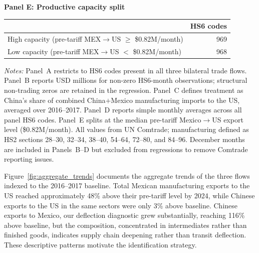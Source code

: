 \documentclass[11pt]{article}
\begin{document}
\begin{table}[tbp]
\begin{threeparttable}
\bigskip

\textbf{Panel E: Productive capacity split} \\[4pt]
\begin{tabular}{lr}
\toprule
 & HS6 codes \\
\midrule
High capacity (pre-tariff MEX$\to$US $\geq$ \$0.82M/month) & 969 \\
Low capacity  (pre-tariff MEX$\to$US $<$  \$0.82M/month)  & 968 \\
\bottomrule
\end{tabular}

\begin{tablenotes}[flushleft]
\footnotesize
\item \textit{Notes:}
Panel~A restricts to HS6 codes present in all three bilateral trade flows.
Panel~B reports USD millions for non-zero HS6-month observations; structural non-trading zeros are retained in the regression.
Panel~C defines treatment as China's share of combined China$+$Mexico manufacturing imports to the US, averaged over 2016--2017.
Panel~D reports simple monthly averages across all panel HS6 codes.
Panel~E splits at the median pre-tariff Mexico$\to$US export level
(\$0.82M/month).
All values from UN Comtrade; manufacturing defined as HS2 sections 28--30,
32--34, 38--40, 54--64, 72--80, and 84--96.
December months are included in Panels~B--D but excluded from regressions
to remove Comtrade reporting issues.
\end{tablenotes}

\end{threeparttable}
\end{table}

Figure~\ref{fig:aggregate_trends} documents the aggregate trends of the
three flows indexed to the 2016--2017 baseline. Total Mexican manufacturing
exports to the US reached approximately 48\% above their pre-tariff level
by 2024, while Chinese exports to the US in the same sectors were only 3\% above baseline. Chinese exports to Mexico,
our deflection diagnostic grew substantially, reaching 116\% above
baseline, but the composition, concentrated in intermediates rather than
finished goods, indicates supply chain deepening rather than
transit deflection. These descriptive patterns motivate the
identification strategy.
\end{document}
